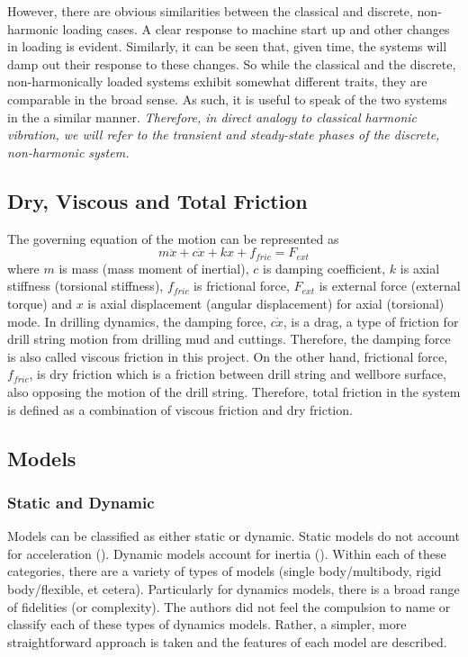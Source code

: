 However, there are obvious similarities between the classical and discrete, non-harmonic loading cases.  A clear response to machine start up and other changes in loading is evident.  Similarly, it can be seen that, given time, the systems will damp out their response to these changes. So while the classical and the discrete, non-harmonically loaded systems exhibit somewhat different traits, they are comparable in the broad sense.  As such, it is useful to speak of the two systems in the a similar manner.  \emph{Therefore, in direct analogy to classical harmonic vibration, we will refer to the transient and steady-state phases of the discrete, non-harmonic system.}

\subsection{Dry, Viscous and Total Friction}
The governing equation of the motion can be represented as
\begin{equation}\label{eq:motion_GE}
    m\ddot{x} + c\dot{x} + kx + f_{fric} = F_{ext}
\end{equation}
where $m$ is mass (mass moment of inertial), $c$ is damping coefficient, $k$ is axial stiffness (torsional stiffness), $f_{fric}$ is frictional force, $F_{ext}$ is external force (external torque) and $x$ is axial displacement (angular displacement) for axial (torsional) mode. In drilling dynamics, the damping force, $c\dot{x}$, is a drag, a type of friction for drill string motion from drilling mud and cuttings. Therefore, the damping force is also called viscous friction in this project. On the other hand, frictional force, $f_{fric}$, is dry friction which is a friction between drill string and wellbore surface, also opposing the motion of the drill string. Therefore, total friction in the system is defined as a combination of viscous friction and dry friction.

\subsection{Models}
\subsubsection{Static and Dynamic}
Models can be classified as either static or dynamic.  Static models do not account for acceleration (\staticforcebalance{}).  Dynamic models account for inertia (\dynamicforcebalance{}).  Within each of these categories, there are a variety of types of models (single body/multibody, rigid body/flexible, et cetera).  Particularly for dynamics models, there is a broad range of fidelities (or complexity).  The authors did not feel the compulsion to name or classify each of these types of dynamics models.  Rather, a simpler, more straightforward approach is taken and the features of each model are described.

